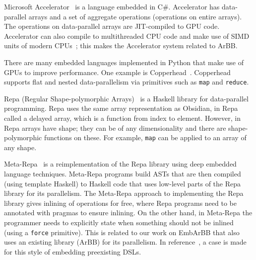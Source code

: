\documentclass[a4paper]{book}
\begin{document}
Microsoft Accelerator~\citet{ACCELERATOR} is a language embedded in C\#. Accelerator has
data-parallel arrays and a set of aggregate operations (operations on entire arrays). The 
operations on data-parallel arrays are JIT-compiled to GPU code. Accelerator can also 
compile to multithreaded CPU code and make use of SIMD units of modern 
CPUs~\citet{ACCELERATORCPU}; this makes the Accelerator system related to ArBB. 

There are many embedded languages implemented in Python that make use of GPUs 
to improve performance. One example is Copperhead~\citet{copperhead}. Copperhead 
supports flat and nested data-parallelism via primitives such as {\tt map} and 
{\tt reduce}.  


Repa (Regular Shape-polymorphic Arrays)~\citet{REPA} is a Haskell library for 
data-parallel programming. 
Repa uses the same array representation as Obsidian, in Repa called a delayed
array, which is a function from index to element. However, in Repa arrays have shape; 
they can be of any dimensionality and there are shape-polymorphic functions on these. 
For example, {\tt map} can be applied to an array of any shape. 

Meta-Repa~\citet{METAREPA} is a reimplementation of the Repa library using deep embedded language 
techniques. Meta-Repa programs build ASTs that are then compiled (using template 
Haskell) to Haskell code that uses low-level parts of the Repa library for its parallelism.
The Meta-Repa approach to implementing the Repa library 
gives inlining of operations for free, where Repa programs need to be annotated 
with pragmas to ensure inlining. On the other hand, in Meta-Repa the programmer 
needs to explicitly state when something should not be inlined (using a {\tt force} primitive).
This is related to our work on EmbArBB that also uses an existing library (ArBB) 
for its parallelism. In reference~\citet{FPCDSL}, a case is made for this style 
of embedding preexisting DSLs. 
\end{document}
